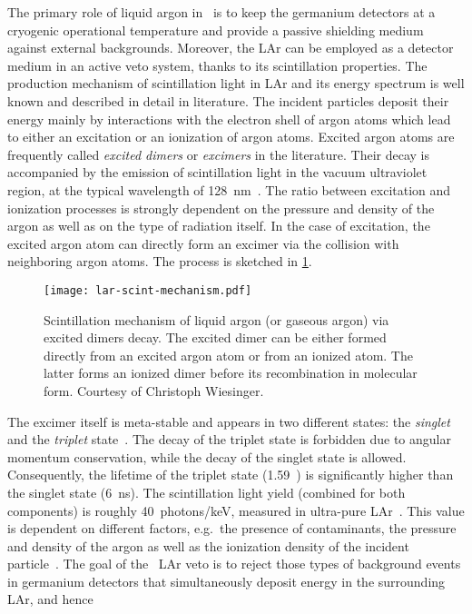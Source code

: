 The primary role of liquid argon in \gerda\ is to keep the germanium detectors at a
cryogenic operational temperature and provide a passive shielding medium against external
backgrounds. Moreover, the LAr can be employed as a detector medium in an active veto
system, thanks to its scintillation properties. The production mechanism of scintillation
light in LAr and its energy spectrum is well known and described in detail in literature.
The incident particles deposit their energy mainly by interactions with the electron shell
of argon atoms which lead to either an excitation or an ionization of argon atoms. Excited
argon atoms are frequently called \emph{excited dimers} or \emph{excimers} in the
literature. Their decay is accompanied by the emission of scintillation light in the
vacuum ultraviolet region, at the typical wavelength of 128~nm~\cite{Heindl2010}. The
ratio between excitation and ionization processes is strongly dependent on the pressure
and density of the argon as well as on the type of radiation itself. In the case of
excitation, the excited argon atom can directly form an excimer via the collision with
neighboring argon atoms. The process is sketched in \cref{fig:setup:lar-scint}.
\begin{figure}
  \centering
  \texttt{[image: lar-scint-mechanism.pdf]}
  \caption{%
    Scintillation mechanism of liquid argon (or gaseous argon) via excited dimers decay.
    The excited dimer can be either formed directly from an excited argon atom or from an
    ionized atom. The latter forms an ionized dimer before its recombination in molecular
    form. Courtesy of Christoph Wiesinger.
  }\label{fig:setup:lar-scint}
\end{figure}
The excimer itself is meta-stable and appears in two different states: the \emph{singlet}
and the \emph{triplet} state~\cite{Jortner1965, McCusker1984}.  The decay of the triplet
state is forbidden due to angular momentum conservation, while the decay of the singlet
state is allowed. Consequently, the lifetime of the triplet state (1.59~\mus) is
significantly higher than the singlet state (6~ns). The scintillation light yield
(combined for both components) is roughly 40~photons/keV, measured in ultra-pure
LAr~\cite{Doke1988}. This value is dependent on different factors, e.g.~the presence of
contaminants, the pressure and density of the argon as well as the ionization density of
the incident particle~\cite{Doke1988}.
\newpar
The goal of the \gerda\ LAr veto is to reject those types of background events in
germanium detectors that simultaneously deposit energy in the surrounding LAr, and hence
